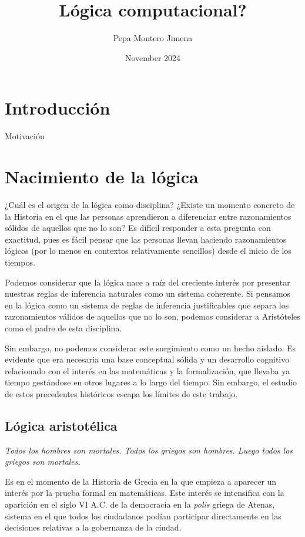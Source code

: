 \documentclass{article}
\title{Lógica computacional?}
\author{Pepa Montero Jimena}
\date{November 2024}
\begin{document}
\maketitle


\section{Introducción}

Motivación


\section{Nacimiento de la lógica}

¿Cuál es el origen de la lógica como disciplina? ¿Existe un momento concreto de la Historia en el que las personas aprendieron a diferenciar entre razonamientos sólidos de aquellos que no lo son? Es difícil responder a esta pregunta con exactitud, pues es fácil pensar que las personas llevan haciendo razonamientos lógicos (por lo menos en contextos relativamente sencillos) desde el inicio de los tiempos.

Podemos considerar que la lógica nace a raíz del creciente interés por presentar nuestras reglas de inferencia naturales como un sistema coherente. Si pensamos en la lógica como un sistema de reglas de inferencia justificables que separa los razonamientos válidos de aquellos que no lo son, podemos considerar a Aristóteles como el padre de esta disciplina\cite{moravcsik2004logic}. 

Sin embargo, no podemos considerar este surgimiento como un hecho aislado. Es evidente que era necesaria una base conceptual sólida y un desarrollo cognitivo relacionado con el interés en las matemáticas y la formalización, que llevaba ya tiempo gestándose en otros lugares a lo largo del tiempo. Sin embargo, el estudio de estos precedentes históricos escapa los límites de este trabajo.

\subsection{Lógica aristotélica}

\begin{displayquote}
    \textit{Todos los hombres son mortales. Todos los griegos son hombres. Luego todos los griegos son mortales.}
\end{displayquote}

Es en el momento de la Historia de Grecia en la que empieza a aparecer un interés por la prueba formal en matemáticas. Este interés se intensifica con la aparición en el siglo VI A.C. de la democracia en la \textit{polis} griega de Atenas, sistema en el que todos los ciudadanos podían participar directamente en las decisiones relativas a la gobernanza de la ciudad.
\end{document}
